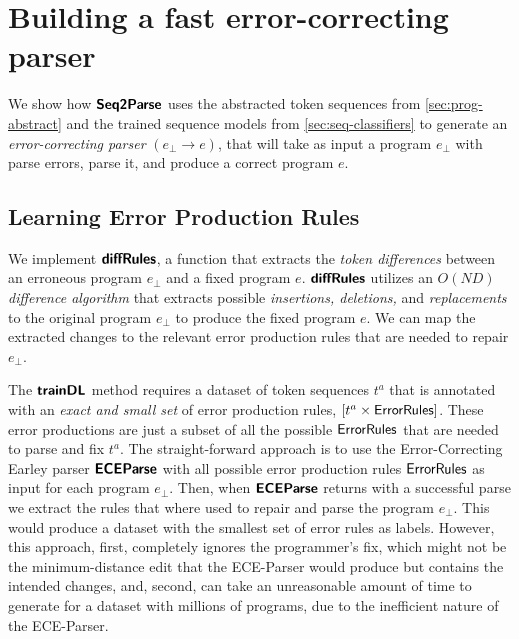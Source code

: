 \section{Building a fast error-correcting parser}
\label{sec:whole-system}

We show how $\bm{\mathsf{Seq2Parse}}$ uses the abstracted token sequences from
\autoref{sec:prog-abstract} and the trained sequence models from
\autoref{sec:seq-classifiers} to generate an \emph{error-correcting parser}
$(e_{\bot} \to e)$, that will take as input a program $e_{\bot}$ with parse
errors, parse it, and produce a correct program $e$.


\subsection{Learning Error Production Rules}
\label{sec:whole-system:error-rules}
We implement $\bm{\mathsf{diffRules}}$, a function that extracts the \emph{token differences}
between an erroneous program $e_{\bot}$ and a fixed program $e$. $\bm{\mathsf{diffRules}}$
utilizes an \emph{$O(ND)$ difference algorithm} \citep{Myers_1986} that extracts
possible \emph{insertions, deletions,} and \emph{replacements} to the original
program $e_{\bot}$ to produce the fixed program $e$. We can map the extracted
changes to the relevant error production rules that are needed to repair
$e_{\bot}$.

%
The $\bm{\mathsf{trainDL}}$ method requires a dataset of token sequences $t^a$ that is
annotated with an \emph{exact and small set} of error production rules, \ie
$[t^a \times \mathsf{ErrorRules}]$. These error productions are just a subset of
all the possible $\mathsf{ErrorRules}$ that are needed to parse and fix $t^a$. The
straight-forward approach is to use the Error-Correcting Earley parser
$\bm{\mathsf{ECEParse}}$ with all possible error production rules $\mathsf{ErrorRules}$ as input
for each program $e_{\bot}$. Then, when $\bm{\mathsf{ECEParse}}$ returns with a successful
parse we extract the rules that where used to repair and parse the program
$e_{\bot}$. This would produce a dataset with the smallest set of error rules as
labels. However, this approach, first, completely ignores the programmer's fix,
which might not be the minimum-distance edit that the ECE-Parser would produce
but contains the intended changes, and, second, can take an unreasonable amount
of time to generate for a dataset with millions of programs, due to the
inefficient nature of the ECE-Parser.

